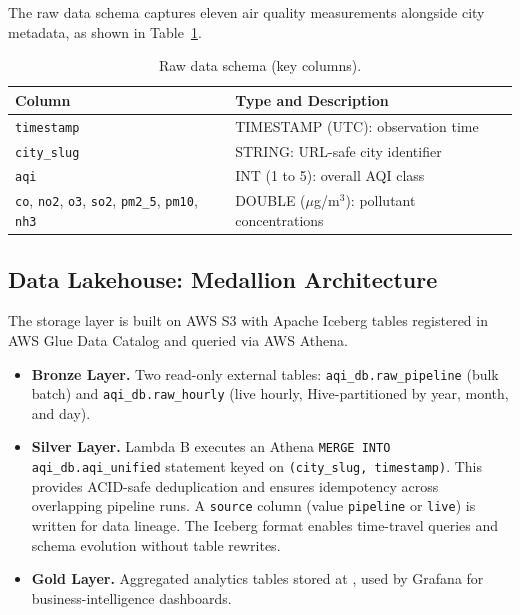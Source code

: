 \documentclass[sigconf, nonacm]{acmart}
\begin{document}
The raw data schema captures eleven air quality measurements
alongside city metadata, as shown in Table~\ref{tab:schema}.

\begin{table}[h]
  \caption{Raw data schema (key columns).}
  \label{tab:schema}
  \small
  \begin{tabular}{@{}p{2.0cm}p{5.2cm}@{}}
    \toprule
    \textbf{Column} & \textbf{Type and Description} \\
    \midrule
    \texttt{timestamp}  & TIMESTAMP (UTC): observation time \\[2pt]
    \texttt{city\_slug} & STRING: URL-safe city identifier \\[2pt]
    \texttt{aqi}        & INT (1 to 5): overall AQI class \\[2pt]
    \texttt{co}, \texttt{no2}, \texttt{o3},
    \texttt{so2}, \texttt{pm2\_5},
    \texttt{pm10}, \texttt{nh3}
      & DOUBLE ($\mu$g/m$^{3}$): pollutant concentrations \\
    \bottomrule
  \end{tabular}
\end{table}

\subsection{Data Lakehouse: Medallion Architecture}

The storage layer is built on AWS S3 with Apache Iceberg
tables registered in AWS Glue Data Catalog and queried via
AWS Athena.

\begin{itemize}
  \item \textbf{Bronze Layer.}  Two read-only external
        tables: \texttt{aqi\_db.raw\_pipeline} (bulk batch)
        and \texttt{aqi\_db.raw\_hourly} (live hourly,
        Hive-partitioned by year, month, and day).

  \item \textbf{Silver Layer.}  Lambda B executes an Athena
        \texttt{MERGE INTO aqi\_db.aqi\_unified} statement
        keyed on \texttt{(city\_slug, timestamp)}.  This
        provides ACID-safe deduplication and ensures
        idempotency across overlapping pipeline runs.
        A \texttt{source} column (value \texttt{pipeline}
        or \texttt{live}) is written for data lineage.
        The Iceberg format enables time-travel queries and
        schema evolution without table rewrites.

  \item \textbf{Gold Layer.}  Aggregated analytics tables
        stored at
        ,
        used by Grafana for business-intelligence dashboards.
\end{itemize}
\end{document}
